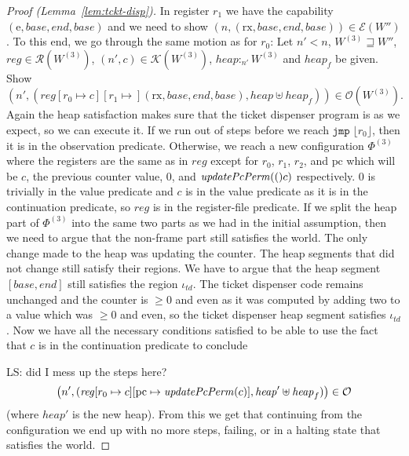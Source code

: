 \documentclass{article}
\newcommand{\update}[2]{[#1 \mapsto #2]}
\newcommand\lau[1]{{\color{purple} \sf \footnotesize {LS: #1}}\\}
\newcommand{\var}[1]{\mathit{#1}}
\newcommand{\pcreg}{\mathrm{pc}}
\newcommand{\reg}{\var{reg}}
\newcommand{\heap}{\var{heap}}
\newcommand{\plainfun}[2]{
  \ifthenelse{\equal{#2}{}}
             {\mathit{#1}}
             {\mathit{#1}(#2)}
}
\newcommand{\updatePcPerm}[1]{\plainfun{updatePcPerm}{#1}}
\newcommand{\future}{\mathbin{\sqsupseteq}}
\newcommand{\heapSat}[3][\heap]{#1 :_{#2} #3}
\newcommand{\asmType}{\plaindom{AsmType}}
\newcommand{\plaindom}[1]{\mathrm{#1}}
\newcommand{\intr}[2]{\mathcal{#1}}
\newcommand{\exprintr}[1]{\intr{E}{#1}}
\newcommand{\contintr}[1]{\intr{K}{#1}}
\newcommand{\regintr}[1]{\intr{R}{#1}}
\newcommand{\stder}{\exprintr{\asmType}}
\newcommand{\stdrr}{\regintr{\asmType}}
\newcommand{\stdkr}{\contintr{\asmType}}
\newcommand{\observations}{\mathcal{O}}
\newcommand{\npair}[2][n]{\left(#1,#2 \right)}
\newcommand{\refreg}[1]{\lfloor #1 \rfloor}
\newcommand{\zinstr}[1]{\mathtt{#1}}
\newcommand{\oneinstr}[2]{\zinstr{#1} \; #2}
\newcommand{\jmp}[1]{\oneinstr{jmp}{#1}}
\newcommand{\plainperm}[1]{\mathrm{#1}}
\newcommand{\exec}{\plainperm{rx}}
\newcommand{\entry}{\plainperm{e}}
\begin{document}
\begin{proof}[Proof (Lemma~\ref{lem:tckt-disp})]
In register $r_1$ we have the capability $(\entry,\var{base},\var{end},\var{base})$ and we need to show $\npair[n]{(\exec,\var{base},\var{end},\var{base})} \in \stder(W'')$. To this end, we go through the same motion as for $r_0$:  Let $n' < n$, $W^{(3)} \future W''$, $\reg \in \stdrr(W^{(3)})$, $\npair[n']{c} \in \stdkr(W^{(3)})$, $\heapSat[\heap]{n'}{W^{(3)}}$ and $\heap_f$ be given. Show 
\[
\npair[n']{(\reg[r_0 \mapsto c][r_1 \mapsto ](\exec,\var{base},\var{end},\var{base}), \heap \uplus \heap_f)} \in \observations(W^{(3)}).
\]
Again the heap satisfaction makes sure that the ticket dispenser program is as we expect, so we can execute it. If we run out of steps before we reach $\jmp{\refreg{r_0}}$, then it is in the observation predicate. Otherwise, we reach a new configuration $\Phi^{(3)}$ where the registers are the same as in $\reg$ except for $r_0$, $r_1$, $r_2$, and $\pcreg$ which will be $c$, the previous counter value, $0$, and $\updatePcPerm(c)$ respectively. $0$ is trivially in the value predicate and $c$ is in the value predicate as it is in the continuation predicate, so $\reg$ is in the register-file predicate. If we split the heap part of $\Phi^{(3)}$ into the same two parts as we had in the initial assumption, then we need to argue that the non-frame part still satisfies the world. The only change made to the heap was updating the counter. The heap segments that did not change still satisfy their regions. We have to argue that the heap segment $[\var{base},\var{end}]$ still satisfies the region $\iota_{\var{td}}$. The ticket dispenser code remains unchanged and the counter is $\geq 0$ and even as it was computed by adding two to a value which was $\geq 0$ and even, so the ticket dispenser heap segment satisfies $\iota_{\var{td}}$. Now we have all the necessary conditions satisfied to be able to use the fact that $c$ is in the continuation predicate to conclude 

\lau{did I mess up the steps here?}
\[
\npair[n']{(\reg\update{r_0}{c}\update{\pcreg}{\updatePcPerm{c}}, \heap' \uplus \heap_f)} \in \observations
\]
(where $\heap'$ is the new heap). From this we get that continuing from the configuration we end up with no more steps, failing, or in a halting state that satisfies the world.



\end{proof}
\end{document}
